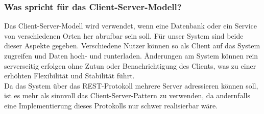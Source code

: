 \subsubsection{Was spricht für das Client-Server-Modell?}
Das Client-Server-Modell wird verwendet, wenn eine Datenbank oder ein Service von verschiedenen Orten her abrufbar sein soll. Für unser System sind beide dieser Aspekte gegeben. Verschiedene Nutzer können so als Client auf das System zugreifen und Daten hoch- und runterladen. Änderungen am System können rein serverseitig erfolgen ohne Zutun oder Benachrichtigung des Clients, was zu einer erhöhten Flexibilität und Stabilität führt.\\
Da das System über das REST-Protokoll mehrere Server adressieren können soll, ist es mehr als sinnvoll das Client-Server-Pattern zu verwenden, da andernfalls eine Implementierung dieses Protokolls nur schwer realisierbar wäre. 




%